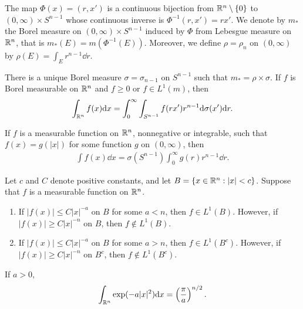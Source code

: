 The map $\Phi (x) =(r, x')$ is a continuous bijection from $\mathbb{R}^n \setminus \{0\}$ to $(0, \infty) \times S^{n-1}$ whose continuous inverse is $\Phi^{-1}(r, x') = rx'$.
We denote by $m_{*}$ the Borel measure on $(0, \infty) \times S^{n-1}$ induced by $\Phi$ from Lebesgue measure on $\mathbb{R}^n$, that is $m_{*}(E) = m(\Phi^{-1}(E))$.
Moreover, we define $\rho = \rho_n$ on $(0, \infty)$ by $\rho(E) = \int_E r^{n-1} \dd r$.

\begin{theorem}
    There is a unique Borel measure $\sigma = \sigma_{n-1}$ on $S^{n-1}$ such that $m_{*} = \rho \times \sigma$.
    If $f$ is Borel measurable on $\mathbb{R}^n$ and $f \ge 0$ or $f \in L^1(m)$, then
    \begin{align}
        \int_{\mathbb{R}^n} f(x) \mathrm{d} x = \int_{0}^{\infty} \int_{S^{n-1}} f(rx') r^{n-1} \mathrm{d} \sigma(x') \mathrm{d} r.
    \end{align}
\end{theorem}

\begin{corollary}
    If $f$ is a measurable function on $\mathbb{R}^n$, nonnegative or integrable, such that $f(x) = g(|x|)$ for some function $g$ on $(0, \infty)$, then
    \begin{align}
        \int f(x) \dd x = \sigma(S^{n-1}) \int_{0}^{\infty} g(r) r^{n-1} \dd r.
    \end{align}
\end{corollary}

\begin{corollary}
    Let $c$ and $C$ denote positive constants, and let $B = \{x \in \mathbb{R}^n: |x| < c \}$.
    Suppose that $f$ is a measurable function on $\mathbb{R}^n$.
    \begin{enumerate}
        \item If $|f(x)| \le C|x|^{-a}$ on $B$ for some $a < n$, then $f \in L^1(B)$. However, if $|f(x)| \ge C|x|^{-n}$ on $B$, then $f \notin L^1(B)$.
        \item If $|f(x)| \le C|x|^{-a}$ on $B$ for some $a > n$, then $f \in L^1(B^c)$. However, if $|f(x)| \ge C|x|^{-n}$ on $B^c$, then $f \notin L^1(B^c)$.
    \end{enumerate}
\end{corollary}

\begin{proposition}
    If $a > 0$, 
    \begin{align}
        \int_{\mathbb{R}^n} \exp(-a |x|^2) \mathrm{d} x = \left(\frac{\pi}{a}\right)^{n/2}.
    \end{align}
\end{proposition}

